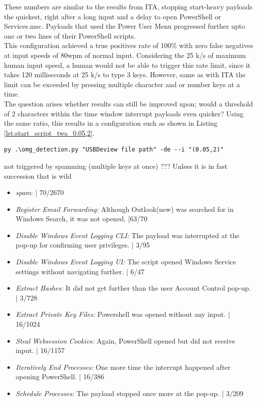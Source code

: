 These numbers are similar to the results from ITA, stopping start-heavy payloads the quickest, right after a long input and a delay to open PowerShell or Services.msc. Payloads that used the Power User Menu progressed further upto one or two lines of their PowerShell scripts. \\
This configuration achieved a true positives rate of 100\% with zero false negatives at input speeds of 80wpm of normal input. Considering the 25 k/s of maximum human input speed, a human would not be able to trigger this rate limit, since it takes 120 milliseconds at 25 k/s to type 3 keys. However, same as with ITA the limit can be exceeded by pressing multiple character and or number keys at a time. \\
The question arises whether results can still be improved upon; would a threshold of 2 characters within the time window interrupt payloads even quicker? Using the same ratio, this results in a configuration such as shown in Listing \ref{lst:start_script_twa_0.05,2}. 


\begin{lstlisting}[caption={start defence Script with TWA (0.05,2)},label={lst:start_script_twa_0.05,2}, captionpos=b]
 py .\omg_detection.py "USBDeview file path" -de --i "(0.05,2)"
\end{lstlisting}

not triggered by spamming (multiple keys at once) ??? Unless it is in fast succession that is wild

\begin{itemize}
    \item  \emph{spam}:  | 70/2670
    \item  \emph{Register Email Forwarding:} Although Outlook(new) was searched for in Windows Search, it was not opened.  |63/70 
    \item  \emph{Disable Windows Event Logging CLI:} The payload was interrupted at the pop-up for confirming user privileges. | 3/95
    \item  \emph{Disable Windows Event Logging UI:} The script opened Windows Service settings without navigating further.  | 6/47
    \item  \emph{Extract Hashes:} It did not get further than the user Account Control pop-up. | 3/728 
    \item  \emph{Extract Private Key Files:} Powershell was opened without any input. | 16/1024
    \item  \emph{Steal Websession Cookies:} Again, PowerShell opened but did not receive input. | 16/1157
    \item  \emph{Iteratively End Processes:} One more time the interrupt happened after opening PowerShell.  | 16/386
    \item  \emph{Schedule Processes:}  The payload stopped once more at the pop-up. | 3/209
\end{itemize}

